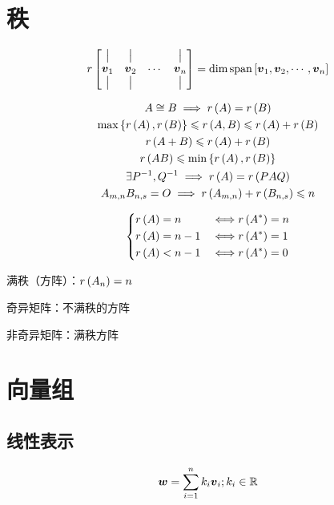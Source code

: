 \documentclass{article}
\begin{document}
\section{秩}

\begin{definition}
    \[r\begin{bmatrix}
            \big| & \big| &        & \big| \\
            \boldsymbol v_1  & \boldsymbol v_2  & \cdots & \boldsymbol v_n  \\
            \big| & \big| &        & \big|
        \end{bmatrix}
        =\dim\mathrm{span}\left[\boldsymbol v_1,\boldsymbol v_2,\cdots,\boldsymbol v_n\right]\]
\end{definition}

\[\begin{gathered}
        A\cong B\implies r\left(A\right)=r\left(B\right)\\
        \max\left\{r\left(A\right),r\left(B\right)\right\}\leqslant r\left(A,B\right)\leqslant r\left(A\right)+r\left(B\right)\\
        r\left(A+B\right)\leqslant r\left(A\right)+r\left(B\right)\\
        r\left(AB\right)\leqslant\min\left\{r\left(A\right),r\left(B\right)\right\}\\
        \exists P^{-1},Q^{-1}\implies r\left(A\right)=r\left(PAQ\right)\\
        A_{m,n}B_{n,s}=O\implies r\left(A_{m,n}\right)+r\left(B_{n,s}\right)\leqslant n
    \end{gathered}\]

\[\left\{\begin{aligned}
        r\left(A\right) & =n   & \iff & r\left(A^*\right)=n \\
        r\left(A\right) & =n-1 & \iff & r\left(A^*\right)=1 \\
        r\left(A\right) & <n-1 & \iff & r\left(A^*\right)=0
    \end{aligned}\right.\]

满秩（方阵）：$r\left(A_n\right)=n$

奇异矩阵：不满秩的方阵

非奇异矩阵：满秩方阵

\section{向量组}

\subsection{线性表示}

\[\boldsymbol w=\sum_{i=1}^nk_i\boldsymbol v_i;k_i\in\mathbb R\]
\end{document}
